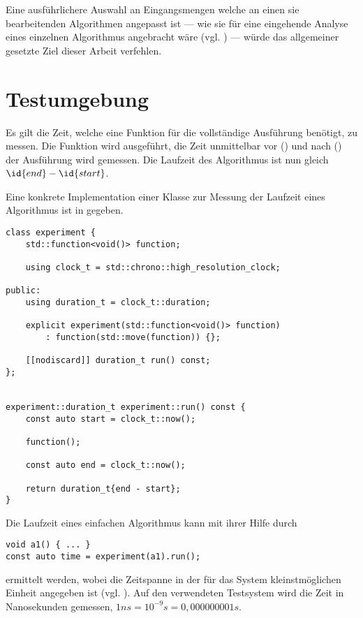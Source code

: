 Eine ausführlichere Auswahl an Eingangsmengen welche an einen sie bearbeitenden Algorithmen angepasst ist --- wie sie für eine eingehende Analyse eines einzelnen Algorithmus angebracht wäre (vgl. \cite[27ff]{mcg2012}) --- würde das allgemeiner gesetzte Ziel dieser Arbeit verfehlen.

\section{Testumgebung}
\label{sec:runtime-environment}

Es gilt die Zeit, welche eine Funktion für die vollständige Ausführung benötigt, zu messen. Die Funktion wird ausgeführt, die Zeit unmittelbar vor () und nach () der Ausführung wird gemessen. Die Laufzeit des Algorithmus ist nun gleich $\id{end} - \id{start}$.

Eine konkrete Implementation einer Klasse zur Messung der Laufzeit eines Algorithmus ist in  gegeben.

\begin{lstlisting}[caption={Implementation einer Klasse zur Ermittlung der Laufzeit eines Algorithmus.}, label=lst:experiment]
class experiment {
	std::function<void()> function;

	using clock_t = std::chrono::high_resolution_clock;

public:
	using duration_t = clock_t::duration;

	explicit experiment(std::function<void()> function)
		: function(std::move(function)) {};

	[[nodiscard]] duration_t run() const;
};


experiment::duration_t experiment::run() const {
	const auto start = clock_t::now();

	function();

	const auto end = clock_t::now();

	return duration_t{end - start};
}
\end{lstlisting}
\noindent
Die Laufzeit eines einfachen Algorithmus kann mit ihrer Hilfe durch
\begin{lstlisting}[numbers=none]
void a1() { ... }
const auto time = experiment(a1).run();
\end{lstlisting}
ermittelt werden, wobei die Zeitspanne in der für das System kleinstmöglichen Einheit angegeben ist (vgl. \cite[652]{ISO-C++17}). Auf den verwendeten Testsystem wird die Zeit in Nanosekunden gemessen, $1ns = 10^{-9}s = 0,000000001s$.

